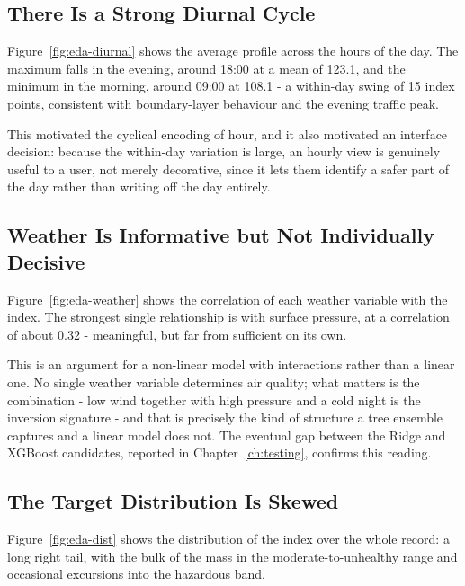 \subsection{There Is a Strong Diurnal Cycle}
Figure~\ref{fig:eda-diurnal} shows the average profile across the hours of the
day. The maximum falls in the evening, around 18:00 at a mean of 123.1, and the
minimum in the morning, around 09:00 at 108.1 - a within-day swing of 15 index
points, consistent with boundary-layer behaviour and the evening traffic peak.


This motivated the cyclical encoding of hour, and it also motivated an interface
decision: because the within-day variation is large, an hourly view is genuinely
useful to a user, not merely decorative, since it lets them identify a safer part
of the day rather than writing off the day entirely.

\subsection{Weather Is Informative but Not Individually Decisive}
Figure~\ref{fig:eda-weather} shows the correlation of each weather variable with
the index. The strongest single relationship is with surface pressure, at a
correlation of about 0.32 - meaningful, but far from sufficient on its own.


This is an argument for a non-linear model with interactions rather than a linear
one. No single weather variable determines air quality; what matters is the
combination - low wind together with high pressure and a cold night is the
inversion signature - and that is precisely the kind of structure a tree ensemble
captures and a linear model does not. The eventual gap between the Ridge and
XGBoost candidates, reported in Chapter~\ref{ch:testing}, confirms this reading.

\subsection{The Target Distribution Is Skewed}
Figure~\ref{fig:eda-dist} shows the distribution of the index over the whole
record: a long right tail, with the bulk of the mass in the moderate-to-unhealthy
range and occasional excursions into the hazardous band.

